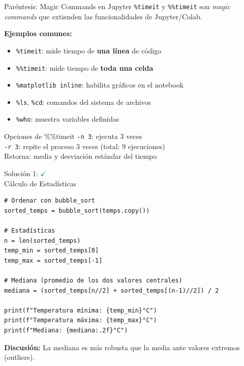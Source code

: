 \documentclass[10pt]{beamer}
\begin{document}
\begin{frame}[fragile]{Paréntesis: Magic Commands en Jupyter}
  \texttt{\%timeit} y \texttt{\%\%timeit} son \textit{magic commands} que extienden 
  las funcionalidades de Jupyter/Colab.
  
  \vspace{0.3cm}
  \textbf{Ejemplos comunes:}
  \begin{itemize}
    \item \texttt{\%timeit}: mide tiempo de \textbf{una línea} de código
    \item \texttt{\%\%timeit}: mide tiempo de \textbf{toda una celda}
    \item \texttt{\%matplotlib inline}: habilita gráficos en el notebook
    \item \texttt{\%ls}, \texttt{\%cd}: comandos del sistema de archivos
    \item \texttt{\%who}: muestra variables definidas
  \end{itemize}
  
  \vspace{0.3cm}
  \begin{block}{Opciones de \%\%timeit}
    \texttt{-n 3}: ejecuta 3 veces\\
    \texttt{-r 3}: repite el proceso 3 veces (total: 9 ejecuciones)\\
    Retorna: media y desviación estándar del tiempo
  \end{block}
\end{frame}

\begin{solutionblock}
\begin{frame}[fragile]{Solución 1: \hfill \textcolor{green}{$\checkmark$} \\ Cálculo de Estadísticas}
\begin{verbatim}
# Ordenar con bubble_sort
sorted_temps = bubble_sort(temps.copy())

# Estadísticas
n = len(sorted_temps)
temp_min = sorted_temps[0]
temp_max = sorted_temps[-1]

# Mediana (promedio de los dos valores centrales)
mediana = (sorted_temps[n//2] + sorted_temps[(n-1)//2]) / 2

print(f"Temperatura mínima: {temp_min}°C")
print(f"Temperatura máxima: {temp_max}°C")
print(f"Mediana: {mediana:.2f}°C")
\end{verbatim}

\textbf{Discusión:} La mediana es más robusta que la media ante valores extremos (outliers).
\end{frame}
\end{solutionblock}
\end{document}
